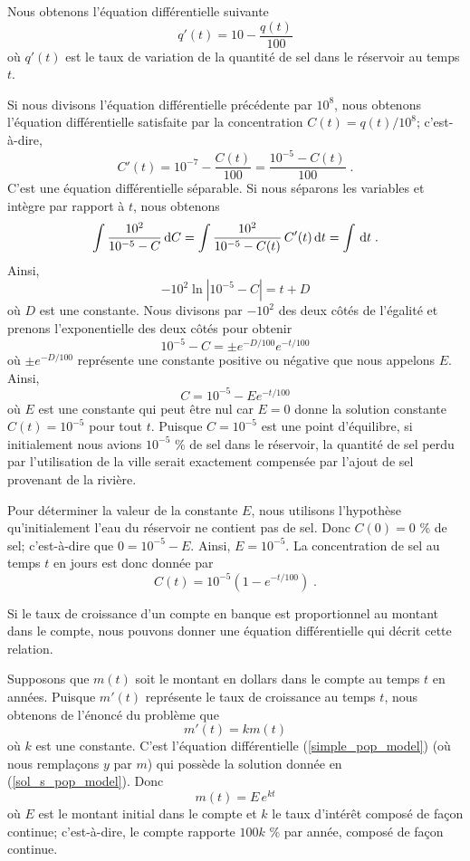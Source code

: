 {\begin{egg}[\eng]
Nous obtenons l'équation différentielle suivante
\[
q'(t) = 10 - \frac{q(t)}{100}
\]
où $q'(t)$ est le taux de variation de la quantité de sel dans le
réservoir au temps $t$.

Si nous divisons l'équation différentielle précédente par $10^8$, nous
obtenons l'équation différentielle satisfaite par la concentration
$C(t) = q(t)/10^8$; c'est-à-dire,
\[
C'(t) = 10^{-7} - \frac{C(t)}{100} = \frac{10^{-5} - C(t)}{100} \; .
\]
C'est une équation différentielle séparable.  Si nous séparons les
variables et intègre par rapport à $t$, nous obtenons
\[
\int \frac{10^2}{10^{-5}-C} \,\mathrm{d}C
= \int \frac{10^2}{10^{-5}- C(t)}\, C'(t) \,\mathrm{d}t = \int \,\mathrm{d}t \; .
\]
Ainsi,
\[
-10^2\ln\left|10^{-5}-C\right| = t + D
\]
où $D$ est une constante.  Nous divisons par $-10^2$ des deux côtés de
l'égalité et prenons l'exponentielle des deux côtés pour obtenir
\[
10^{-5}- C = \pm e^{-D/100} e^{-t/100}
\]
où $\pm e^{-D/100}$ représente une constante positive ou négative que
nous appelons $E$.  Ainsi,
\[
C = 10^{-5} - E e^{-t/100}
\]
où $E$ est une constante qui peut être nul car $E=0$ donne la solution
constante $C(t) = 10^{-5}$ pour tout $t$.  Puisque $C = 10^{-5}$ est
une point d'équilibre, si initialement nous avions
$10^{-5}$ \% de sel dans le réservoir, la quantité de sel perdu par
l'utilisation de la ville serait exactement compensée par l'ajout de
sel provenant de la rivière.

Pour déterminer la valeur de la constante $E$, nous utilisons l'hypothèse
qu'initialement l'eau du réservoir ne contient pas de sel.  Donc
$C(0)=0$ \% de sel; c'est-à-dire que $0 = 10^{-5} -E$.  Ainsi,
$E=10^{-5}$. La concentration de sel au temps $t$ en jours est donc
donnée par
\[
C(t) = 10^{-5}\left(1-e^{-t/100}\right) \; .
\]
\end{egg}

\begin{egg}[\eco]
Si le taux de croissance d'un compte en banque est proportionnel au
montant dans le compte, nous pouvons donner une équation différentielle
qui décrit cette relation.

Supposons que $m(t)$ soit le montant en dollars dans le compte au temps
$t$ en années.
Puisque $m'(t)$ représente le taux de croissance au temps $t$, nous
obtenons de l'énoncé du problème que
\[
m'(t) = k m(t)
\]
où $k$ est une constante.  C'est l'équation différentielle
(\ref{simple_pop_model}) (où nous remplaçons $y$ par $m$) qui possède la
solution donnée en (\ref{sol_s_pop_model}).  Donc 
\[
m(t) = E\, e^{kt}
\]
où $E$ est le montant initial dans le compte et $k$ le taux d'intérêt
composé de façon continue; c'est-à-dire, le compte rapporte $100k$ \%
par année, composé de façon continue.
\end{egg}

}
